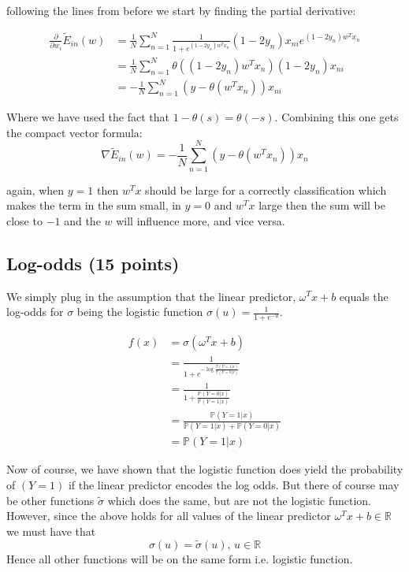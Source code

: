 \documentclass[a4paper,12pt]{article}
\begin{document}
following the lines from before we start by finding the partial derivative:

\begin{align*}
  \frac{\partial }{\partial w_i} 	\tilde{E}_{in}(w)  &= 
  \frac{1}{N} \sum_{n=1}^N \frac{1}{1+e^{(1-2y_n)w^Tx_n}} (1-2y_n)x_{ni}  e^{(1-2y_n)w^Tx_n} \\
   &=  \frac{1}{N} \sum_{n=1}^N \theta\left((1-2y_n)w^Tx_n\right) (1-2y_n)x_{ni}\\
   &=  -\frac{1}{N} \sum_{n=1}^N \left( y -  \theta(w^Tx_n)\right) x_{ni}
\end{align*}

Where we have used the fact that $1-\theta(s) = \theta(-s)$. Combining this one gets the compact vector formula:
$$
\nabla	\tilde{E}_{in}(w)  =	-\frac{1}{N} \sum_{n=1}^N\left( y -  \theta(w^Tx_n)\right) x_{n}
$$

again, when $y = 1$ then $w^Tx$ should be large for a correctly classification which makes the term in the sum small, in $y = 0$ and $w^Tx$  large then the sum will be close to $-1$ and the $w$ will influence more, and vice versa.


\subsection{Log-odds (15 points)}\label{sec:logodds}

We simply plug in the assumption that the linear predictor, $\omega^Tx + b$  equals the log-odds for $\sigma$ being the logistic function $\sigma(u) = \frac{1}{1+e^{-u}}$.

\begin{align*}
f(x) &= \sigma(\omega^Tx + b) \\
&= \frac{1}{1+e^{ -\log\frac{\mathbb{P}(Y = 1 | x)}{\mathbb{P}(Y = 0 | x)}}} \\
&= \frac{1}{1+\frac{\mathbb{P}(Y = 0 | x)}{\mathbb{P}(Y = 1 | x)}} \\
&= \frac{\mathbb{P}(Y = 1 | x)}{\mathbb{P}(Y = 1 | x) +\mathbb{P}(Y = 0| x)} \\
&= \mathbb{P}(Y = 1 | x)
\end{align*}

Now of course, we have shown that the logistic function does yield the probability of $(Y = 1)$ if the linear predictor encodes the log odds. But there of course may be other functions $\tilde{\sigma}$ which does the same, but are not the logistic function. 
However, since the above holds for all values of the linear predictor $\omega^Tx + b \in \mathbb{R}$ we must have that
$$
\sigma(u) =\tilde{\sigma}(u),\, u \in \mathbb{R} 
$$
Hence all other functions will be on the same form i.e. logistic function.

\end{document}

